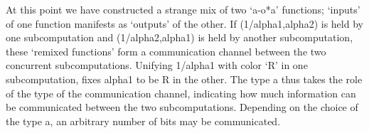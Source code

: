 \documentclass[preprint]{sigplanconf}
\begin{document}
\begin{itemize}
\end{itemize}

At this point we have constructed a strange mix of two `{{a-o*a}}'
functions; `inputs' of one function manifests as `outputs' of the
other. If {{(1/alpha1,alpha2)}} is held by one subcomputation and
{{(1/alpha2,alpha1)}} is held by another subcomputation, these
`remixed functions' form a communication channel between the two
concurrent subcomputations. Unifying {{1/alpha1}} with {{color}}
`{{R}}' in one subcomputation, fixes {{alpha1}} to be {{R}} in the
other. The type {{a}} thus takes the role of the type of the
communication channel, indicating how much information can be
communicated between the two subcomputations.  Depending on the choice
of the type {{a}}, an arbitrary number of bits may be communicated.
\end{document}
